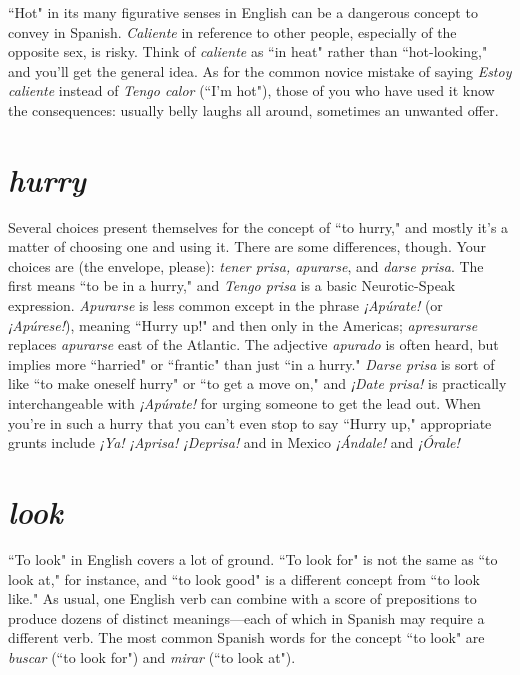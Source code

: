 ``Hot" in its many figurative senses in English can be a dangerous concept to convey in Spanish. \emph{Caliente} in reference to other
people, especially of the opposite sex, is risky. Think of \emph{caliente} as
``in heat" rather than ``hot-looking," and you'll get the general idea. As
for the common novice mistake of saying \emph{Estoy caliente} instead of
\emph{Tengo calor} (``I'm hot"), those of you who have used it know the consequences: usually belly laughs all around, sometimes an unwanted offer.

\section{\emph{hurry}}

Several choices present themselves for the concept of ``to
hurry," and mostly it's a matter of choosing one and using it. There are
some differences, though. Your choices are (the envelope, please): \emph{tener
	prisa, apurarse}, and \emph{darse prisa}. The first means ``to be in a hurry,"
and \emph{Tengo prisa} is a basic Neurotic-Speak expression. \emph{Apurarse} is less
common except in the phrase \emph{¡Apúrate!} (or \emph{¡Apúrese!}), meaning ``Hurry
up!" and then only in the Americas; \emph{apresurarse} replaces \emph{apurarse} east
of the Atlantic. The adjective \emph{apurado} is often heard, but implies more
``harried" or ``frantic" than just ``in a hurry." \emph{Darse prisa} is sort of like
``to make oneself hurry" or ``to get a move on," and \emph{¡Date prisa!} is
practically interchangeable with \emph{¡Apúrate!} for urging someone to get
the lead out. When you're in such a hurry that you can't even stop to
say ``Hurry up," appropriate grunts include \emph{¡Ya! ¡Aprisa! ¡Deprisa!} and
in Mexico \emph{¡Ándale!} and \emph{¡Órale!}

\section{\emph{look}}

``To look" in English covers a lot of ground. ``To look for" is
not the same as ``to look at," for instance, and ``to look good" is a different concept from ``to look like." As usual, one English verb can
combine with a score of prepositions to produce dozens of distinct
meanings---each of which in Spanish may require a different verb. The
most common Spanish words for the concept ``to look" are \emph{buscar} (``to
look for") and \emph{mirar} (``to look at").

